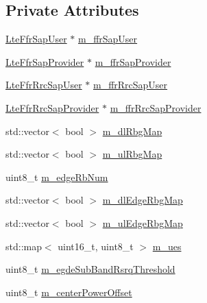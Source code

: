 \subsection*{Private Attributes}
\begin{DoxyCompactItemize}
\item 
\hyperlink{classns3_1_1LteFfrSapUser}{Lte\+Ffr\+Sap\+User} $\ast$ \hyperlink{classns3_1_1LteFfrDistributedAlgorithm_aeb73be970513c3929ae52612972c828e}{m\+\_\+ffr\+Sap\+User}
\item 
\hyperlink{classns3_1_1LteFfrSapProvider}{Lte\+Ffr\+Sap\+Provider} $\ast$ \hyperlink{classns3_1_1LteFfrDistributedAlgorithm_a1a88eaeb3f30519d72f9b8f9d722fa65}{m\+\_\+ffr\+Sap\+Provider}
\item 
\hyperlink{classns3_1_1LteFfrRrcSapUser}{Lte\+Ffr\+Rrc\+Sap\+User} $\ast$ \hyperlink{classns3_1_1LteFfrDistributedAlgorithm_a4098c636e4fdb91625d7319fbc60cc15}{m\+\_\+ffr\+Rrc\+Sap\+User}
\item 
\hyperlink{classns3_1_1LteFfrRrcSapProvider}{Lte\+Ffr\+Rrc\+Sap\+Provider} $\ast$ \hyperlink{classns3_1_1LteFfrDistributedAlgorithm_a1e1f198dba344dfda6191c607532d176}{m\+\_\+ffr\+Rrc\+Sap\+Provider}
\item 
std\+::vector$<$ bool $>$ \hyperlink{classns3_1_1LteFfrDistributedAlgorithm_acbabf1734996d8836383da56239d01d0}{m\+\_\+dl\+Rbg\+Map}
\item 
std\+::vector$<$ bool $>$ \hyperlink{classns3_1_1LteFfrDistributedAlgorithm_a8de1fc607261f9a0bec77c10fc44b818}{m\+\_\+ul\+Rbg\+Map}
\item 
uint8\+\_\+t \hyperlink{classns3_1_1LteFfrDistributedAlgorithm_a93d1edadbdbf673c780413e7232fec02}{m\+\_\+edge\+Rb\+Num}
\item 
std\+::vector$<$ bool $>$ \hyperlink{classns3_1_1LteFfrDistributedAlgorithm_ae8146d08135496d887ac9a5fac8a3f5a}{m\+\_\+dl\+Edge\+Rbg\+Map}
\item 
std\+::vector$<$ bool $>$ \hyperlink{classns3_1_1LteFfrDistributedAlgorithm_a9a2969aa567092eb87a9802fc2fed706}{m\+\_\+ul\+Edge\+Rbg\+Map}
\item 
std\+::map$<$ uint16\+\_\+t, uint8\+\_\+t $>$ \hyperlink{classns3_1_1LteFfrDistributedAlgorithm_a23b1424852e6736058ca1671be44fe5c}{m\+\_\+ues}
\item 
uint8\+\_\+t \hyperlink{classns3_1_1LteFfrDistributedAlgorithm_ade96e62e63dde620a95c7e6cab54f1b8}{m\+\_\+egde\+Sub\+Band\+Rsrq\+Threshold}
\item 
uint8\+\_\+t \hyperlink{classns3_1_1LteFfrDistributedAlgorithm_ad531eeefae2433728d90e170b3d58efc}{m\+\_\+center\+Power\+Offset}

\end{DoxyCompactItemize}
